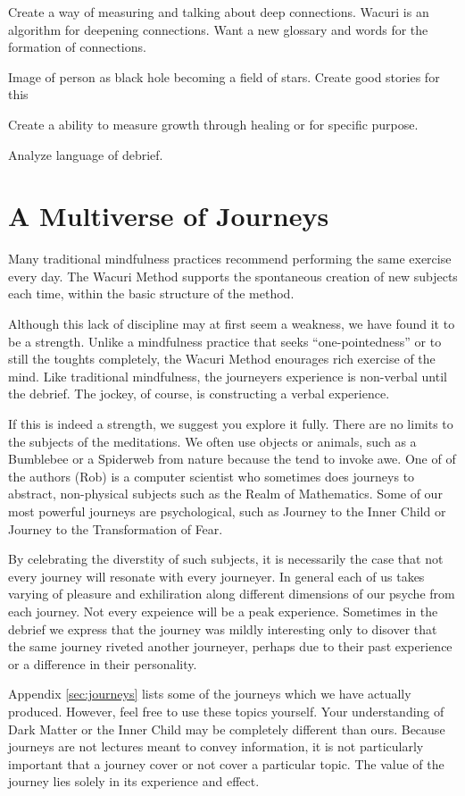 \documentclass[12pt]{book}
\begin{document}
Create a way of measuring and talking about deep connections. Wacuri
is an algorithm for deepening connections. Want a new glossary and
words for the formation of connections.

Image of person as black hole becoming a field of stars. Create good
stories for this

Create a ability to measure growth through healing or for specific
purpose.

Analyze language of debrief.

\chapter{ A Multiverse of Journeys}

Many traditional mindfulness practices recommend performing the
same exercise every day. The Wacuri Method supports the
spontaneous creation of new subjects each time, within the
basic structure of the method.

Although this lack of discipline may at first seem a weakness,
we have found it to be a strength. Unlike a mindfulness practice
that seeks ``one-pointedness'' or to still the toughts completely,
the Wacuri Method enourages rich exercise of the mind. Like
traditional mindfulness, the journeyers experience is non-verbal
until the debrief. The jockey, of course, is constructing a
verbal experience.

If this is indeed a strength, we suggest you explore it
fully. There are no limits to the subjects of the meditations.
We often use objects or animals, such as a Bumblebee or a
Spiderweb from nature because the
tend to invoke awe. One of of the authors (Rob) is a
computer scientist who sometimes does journeys to abstract,
non-physical subjects such as the Realm of Mathematics.
Some of our most powerful journeys are psychological, such
as Journey to the Inner Child or Journey to the Transformation
of Fear.

By celebrating the diverstity of such subjects, it is necessarily
the case that not every journey will resonate with every journeyer.
In general each of us takes varying of pleasure and exhiliration
along different dimensions of our psyche from each journey.
Not every expeience will be a peak experience. Sometimes in
the debrief we express that the journey was mildly interesting
only to disover that the same journey riveted another journeyer,
perhaps due to their past experience or a difference in their
personality.

Appendix \ref{sec:journeys} lists some of the journeys which we have actually
produced. However, feel free to use these topics yourself. Your
understanding of Dark Matter or the Inner Child may be completely
different than ours. Because journeys are not lectures meant
to convey information, it is not particularly important that
a journey cover or not cover a particular topic. The value
of the journey lies solely in its experience and effect.
\end{document}
